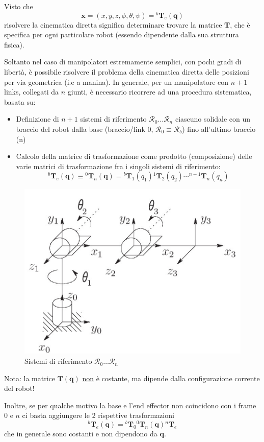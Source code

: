 Visto che
$$
\mathbf{x} = (x, y, z, \phi, \theta, \psi) = {}^b\textbf{T}_e(\mathbf{q})
$$
risolvere la cinematica diretta significa determinare trovare la matrice $\mathbf{T}$, che è specifica per ogni particolare robot (essendo dipendente dalla sua struttura fisica).


Soltanto nel caso di manipolatori estremamente semplici, con pochi gradi di libertà, è possibile risolvere il problema della cinematica diretta delle posizioni per via geometrica (i.e a manina). In generale, per un manipolatore con $n + 1$ links, collegati da $n$ giunti, è necessario ricorrere ad una procedura sistematica, basata su:
\begin{itemize}
	\item Definizione di $n + 1$ sistemi di riferimento $\mathcal{R}_0 \dots \mathcal{R}_n$ ciascuno solidale con un braccio del robot dalla base (braccio/link 0, $\mathcal{R}_0 \equiv \mathcal{R}_b$) fino all’ultimo braccio (n)
	\item Calcolo della matrice di trasformazione come prodotto (composizione) delle varie matrici di trasformazione fra i singoli sistemi di riferimento: 
	$$
	{}^b\textbf{T}_e(\mathbf{q}) \equiv {}^0\textbf{T}_n(\mathbf{q}) = 
	{}^b\textbf{T}_1(q_1)
	{}^1\textbf{T}_2(q_2)
	\cdots
	{}^{n-1}\textbf{T}_n(q_n)
	$$
\end{itemize}

\begin{figure}[H]
	\centering
	\includegraphics[width=0.5\linewidth]{images/kinematics_4}
	\caption{Sistemi di riferimento $\mathcal{R}_0 \dots \mathcal{R}_n$}
	\label{fig:kinematics4}
\end{figure}

Nota: la matrice $\mathbf{T(q)}$ \underline{non} è costante, ma dipende dalla configurazione corrente del robot!

Inoltre, se per qualche motivo la base e l'end effector non coincidono con i frame $0$ e $n$ ci basta aggiungere le 2 rispettive trasformazioni
$$
{}^b\textbf{T}_e(\mathbf{q}) =
{}^b\textbf{T}_0
{}^0\textbf{T}_n(\mathbf{q})
{}^n\textbf{T}_e
$$
che in generale sono costanti e non dipendono da $\mathbf{q}$.


